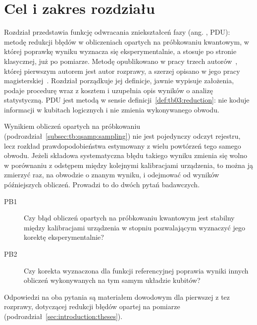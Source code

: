 \section{Cel i zakres rozdziału}\label{sec:pdu:scope}

Rozdział przedstawia funkcję odwracania zniekształceń fazy (ang. , PDU): metodę redukcji błędów w obliczeniach opartych na próbkowaniu kwantowym, w której poprawkę wyniku wyznacza się eksperymentalnie, a stosuje po stronie klasycznej, już po pomiarze.
Metodę opublikowano w pracy trzech autorów~\cite{werner_experiment_driven_2022}, której pierwszym autorem jest autor rozprawy, a szerzej opisano w jego pracy magisterskiej~\cite{werner_magisterka_2022}.
Rozdział porządkuje jej definicje, jawnie wypisuje założenia, podaje procedurę wraz z kosztem i uzupełnia opis wyników o analizę statystyczną.
PDU jest metodą  w sensie definicji~\ref{def:tb03:reduction}: nie koduje informacji w kubitach logicznych i nie zmienia wykonywanego obwodu.

Wynikiem obliczeń opartych na próbkowaniu (podrozdział~\ref{subsec:tb:qsamp:sampling}) nie jest pojedynczy odczyt rejestru, lecz rozkład prawdopodobieństwa estymowany z wielu powtórzeń tego samego obwodu.
Jeżeli składowa systematyczna błędu takiego wyniku zmienia się wolno w porównaniu z odstępem między kolejnymi kalibracjami urządzenia, to można ją zmierzyć raz, na obwodzie o znanym wyniku, i odejmować od wyników późniejszych obliczeń.
Prowadzi to do dwóch pytań badawczych.
\begin{description}
\item[PB1] Czy błąd obliczeń opartych na próbkowaniu kwantowym jest stabilny między kalibracjami urządzenia w stopniu pozwalającym wyznaczyć jego korektę eksperymentalnie?
\item[PB2] Czy korekta wyznaczona dla funkcji referencyjnej poprawia wyniki innych obliczeń wykonywanych na tym samym układzie kubitów?
\end{description}
Odpowiedzi na oba pytania są materiałem dowodowym dla pierwszej z tez rozprawy, dotyczącej redukcji błędów opartej na pomiarze (podrozdział~\ref{sec:introduction:theses}).

